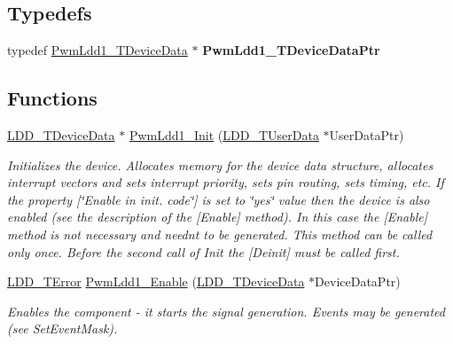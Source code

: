 \subsection*{Typedefs}
\begin{DoxyCompactItemize}
\item 
\mbox{\label{group___pwm_ldd1__module_ga922754aa19568d373c9532a388447748}} 
typedef \hyperlink{struct_pwm_ldd1___t_device_data}{Pwm\+Ldd1\+\_\+\+T\+Device\+Data} $\ast$ {\bfseries Pwm\+Ldd1\+\_\+\+T\+Device\+Data\+Ptr}
\end{DoxyCompactItemize}
\subsection*{Functions}
\begin{DoxyCompactItemize}
\item 
\hyperlink{group___p_e___types__module_gac5cf1362f1f0e3a2ce71b1bf2276d091}{L\+D\+D\+\_\+\+T\+Device\+Data} $\ast$ \hyperlink{group___pwm_ldd1__module_ga275bfbba3cebf17ba3f7ca816cb83da4}{Pwm\+Ldd1\+\_\+\+Init} (\hyperlink{group___p_e___types__module_ga0b66a73f87238a782318aa0be7578e35}{L\+D\+D\+\_\+\+T\+User\+Data} $\ast$User\+Data\+Ptr)
\begin{DoxyCompactList}\small\item\em Initializes the device. Allocates memory for the device data structure, allocates interrupt vectors and sets interrupt priority, sets pin routing, sets timing, etc. If the property \mbox{[}\char`\"{}\+Enable in init. code\char`\"{}\mbox{]} is set to \char`\"{}yes\char`\"{} value then the device is also enabled (see the description of the \mbox{[}Enable\mbox{]} method). In this case the \mbox{[}Enable\mbox{]} method is not necessary and needn\textquotesingle{}t to be generated. This method can be called only once. Before the second call of Init the \mbox{[}Deinit\mbox{]} must be called first. \end{DoxyCompactList}\item 
\hyperlink{group___p_e___types__module_ga24c2b045fd04e79e85f261ce4df35588}{L\+D\+D\+\_\+\+T\+Error} \hyperlink{group___pwm_ldd1__module_gaf9431af80fbe8bb8cd7e756d4b54968f}{Pwm\+Ldd1\+\_\+\+Enable} (\hyperlink{group___p_e___types__module_gac5cf1362f1f0e3a2ce71b1bf2276d091}{L\+D\+D\+\_\+\+T\+Device\+Data} $\ast$Device\+Data\+Ptr)
\begin{DoxyCompactList}\small\item\em Enables the component -\/ it starts the signal generation. Events may be generated (see Set\+Event\+Mask). \end{DoxyCompactList}\item 

\end{DoxyCompactItemize}
